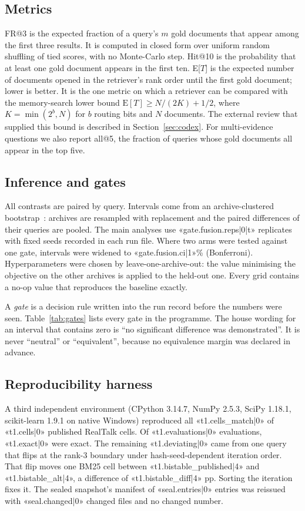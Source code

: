 \documentclass[11pt,a4paper]{article}
\makeatletter
\newcommand{\FR}{FR@3}
\newcommand{\ET}{E[$T$]}
\makeatother
\begin{document}
\subsection{Metrics}
\FR{} is the expected fraction of a query's $m$ gold documents that appear among the first three results. It is computed in closed form over uniform random shuffling of tied scores, with no Monte-Carlo step. Hit@10 is the probability that at least one gold document appears in the first ten. \ET{} is the expected number of documents opened in the retriever's rank order until the first gold document; lower is better. It is the one metric on which a retriever can be compared with the memory-search lower bound $\mathrm{E}[T]\ge N/(2K)+1/2$, where $K=\min(2^{b},N)$ for $b$ routing bits and $N$ documents. The external review that supplied this bound is described in Section~\ref{sec:codex}. For multi-evidence questions we also report all@5, the fraction of queries whose gold documents all appear in the top five.

\subsection{Inference and gates}
All contrasts are paired by query. Intervals come from an archive-clustered bootstrap~\citep{efron1979bootstrap}: archives are resampled with replacement and the paired differences of their queries are pooled. The main analyses use «gate.fusion.reps|0|t» replicates with fixed seeds recorded in each run file. Where two arms were tested against one gate, intervals were widened to «gate.fusion.ci|1»\% (Bonferroni). Hyperparameters were chosen by leave-one-archive-out: the value minimising the objective on the other archives is applied to the held-out one. Every grid contains a no-op value that reproduces the baseline exactly.

A \emph{gate} is a decision rule written into the run record before the numbers were seen. Table~\ref{tab:gates} lists every gate in the programme. The house wording for an interval that contains zero is ``no significant difference was demonstrated''. It is never ``neutral'' or ``equivalent'', because no equivalence margin was declared in advance.



\subsection{Reproducibility harness}
A third independent environment (CPython 3.14.7, NumPy 2.5.3, SciPy 1.18.1, scikit-learn 1.9.1 on native Windows) reproduced all «t1.cells_match|0» of «t1.cells|0» published RealTalk cells. Of «t1.evaluations|0» evaluations, «t1.exact|0» were exact. The remaining «t1.deviating|0» came from one query that flips at the rank-3 boundary under hash-seed-dependent iteration order. That flip moves one BM25 cell between «t1.bistable_published|4» and «t1.bistable_alt|4», a difference of «t1.bistable_diff|4» pp. Sorting the iteration fixes it. The sealed snapshot's manifest of «seal.entries|0» entries was reissued with «seal.changed|0» changed files and no changed number.
\end{document}

